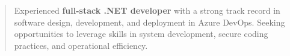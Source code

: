 \begin{quote}
\newline

\fontsize{10pt}{1em}\bodyfontlight\upshape\color{text}
Experienced {\bf full-stack .NET developer} with a strong track record in software design, development, and deployment in Azure DevOps. Seeking opportunities to leverage skills in system development, secure coding practices, and operational efficiency.
\end{quote}

